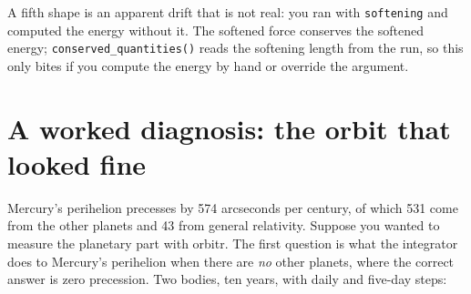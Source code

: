 \documentclass[
  10.5pt,
  letterpaper,
]{scrbook}
\theoremstyle{plain}
\theoremstyle{remark}
\begin{document}
A fifth shape is an apparent drift that is not real: you ran with
\texttt{softening} and computed the energy without it. The softened
force conserves the softened energy; \texttt{conserved\_quantities()}
reads the softening length from the run, so this only bites if you
compute the energy by hand or override the argument.

\section{A worked diagnosis: the orbit that looked
fine}\label{a-worked-diagnosis-the-orbit-that-looked-fine}

Mercury's perihelion precesses by 574 arcseconds per century, of which
531 come from the other planets and 43 from general relativity. Suppose
you wanted to measure the planetary part with orbitr. The first question
is what the integrator does to Mercury's perihelion when there are
\emph{no} other planets, where the correct answer is zero precession.
Two bodies, ten years, with daily and five-day steps:
\end{document}
